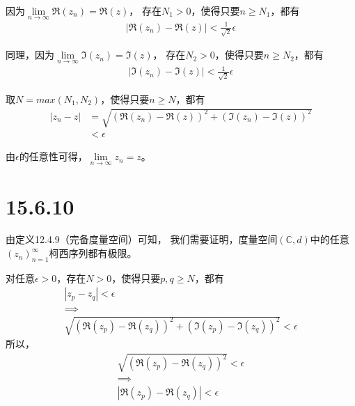 \documentclass{article}
\begin{document}
\begin{itemize}
        因为$\lim\limits_{n \to \infty} \mathfrak{R} (z_n) = \mathfrak{R}(z)$，
        存在$N_1 > 0$，使得只要$n \geq N_1$，都有
        \begin{align*}
          |\mathfrak{R} (z_n) - \mathfrak{R} (z) | < \frac{1}{\sqrt{2}}\epsilon
        \end{align*}

        同理，因为$\lim\limits_{n \to \infty} \mathfrak{I} (z_n) = \mathfrak{I}(z)$，
        存在$N_2 > 0$，使得只要$n \geq N_2$，都有
        \begin{align*}
          |\mathfrak{I} (z_n) - \mathfrak{I} (z) | < \frac{1}{\sqrt{2}}\epsilon
        \end{align*}

        取$N = max(N_1, N_2)$，使得只要$n \geq N$，都有
        \begin{align*}
          |z_n - z|
           & =  \sqrt{(\mathfrak{R} (z_n) - \mathfrak{R}(z))^2 + (\mathfrak{I} (z_n) - \mathfrak{I}(z))^2} \\
           & < \epsilon
        \end{align*}

        由$\epsilon$的任意性可得，$\lim\limits_{n \to \infty} z_n = z$。

\end{itemize}

\section*{15.6.10}

由定义12.4.9（完备度量空间）可知，
我们需要证明，度量空间$(\mathbb{C}, d)$中的任意$(z_n)_{n = 1}^\infty$柯西序列都有极限。

对任意$\epsilon > 0$，存在$N > 0$，使得只要$p, q \geq N$，都有
\begin{align*}
  |z_p - z_q| < \epsilon \\
  \implies               \\
  \sqrt{(\mathfrak{R} (z_p) - \mathfrak{R}(z_q))^2 + (\mathfrak{I} (z_p) - \mathfrak{I}(z_q))^2} < \epsilon
\end{align*}
所以，
\begin{align*}
  \sqrt{(\mathfrak{R} (z_p) - \mathfrak{R}(z_q))^2} < \epsilon \\
  \implies                                                     \\
  |\mathfrak{R} (z_p) - \mathfrak{R}(z_q)| < \epsilon
\end{align*}
\end{document}
